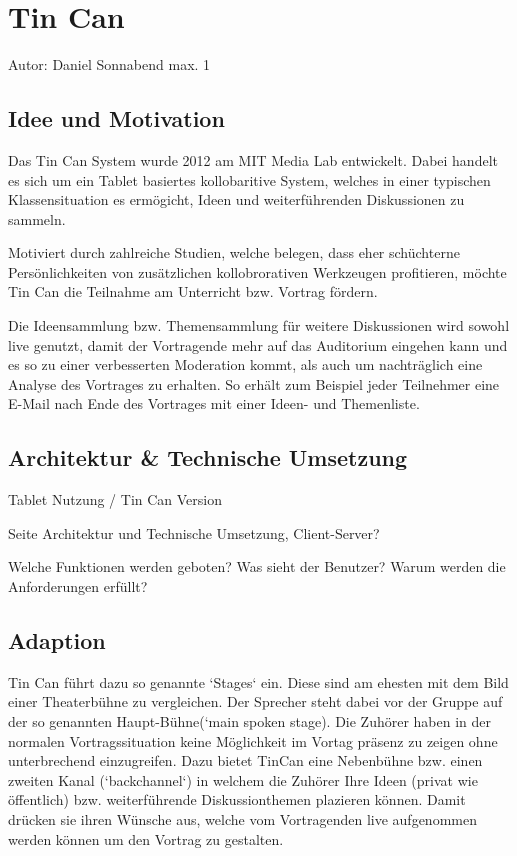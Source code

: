\section{Tin Can}
Autor: Daniel Sonnabend max. 1  

\subsection{Idee und Motivation}
Das Tin Can System \cite{HarGorSch2012} wurde 2012 am MIT Media Lab entwickelt.
Dabei handelt es sich um ein Tablet basiertes kollobaritive System, welches in
einer typischen Klassensituation es ermögicht, Ideen und wei\-ter\-führ\-en\-den
Diskussionen zu sammeln.

Motiviert durch zahlreiche Studien, welche belegen, dass eher schüchterne
Persönlichkeiten von zusätzlichen kollobrorativen Werkzeugen profitieren, möchte
Tin Can die Teilnahme am Unterricht bzw. Vortrag fördern.

Die Ideensammlung bzw. Themensammlung für weitere Diskussionen wird sowohl live
genutzt, damit der Vortragende mehr auf das Auditorium eingehen kann und es so
zu einer verbesserten Moderation kommt, als auch um nach\-träglich eine Analyse
des Vortrages zu erhalten. So erhält zum Beispiel jeder Teilnehmer eine E-Mail
nach Ende des Vortrages mit einer Ideen- und Themenliste.

\subsection{Architektur \& Technische Umsetzung}
Tablet Nutzung / Tin Can Version

Seite Architektur und Technische Umsetzung,
Client-Server?

Welche Funktionen werden geboten? Was sieht der Benutzer? Warum
werden die Anforderungen erfüllt? 

\subsection{Adaption}
Tin Can führt dazu so genannte `Stages` ein. Diese sind am ehesten mit dem Bild
einer Theaterbühne zu vergleichen. Der Sprecher steht dabei vor der Gruppe auf
der so genannten Haupt-Bühne(`main spoken stage). Die Zuhörer haben in der
normalen Vortragssituation keine Möglichkeit im Vortag präsenz zu zeigen ohne
unterbrechend einzugreifen. Dazu bietet TinCan eine Nebenbühne bzw. einen
zweiten Kanal (`backchannel`) in welchem die Zuhörer Ihre Ideen (privat wie
öffentlich) bzw. wei\-ter\-führ\-en\-de Dis\-kus\-sion\-themen plazieren können.
Damit drücken sie ihren Wünsche aus, welche vom Vortragenden live aufgenommen
werden können um den Vortrag zu gestalten.

